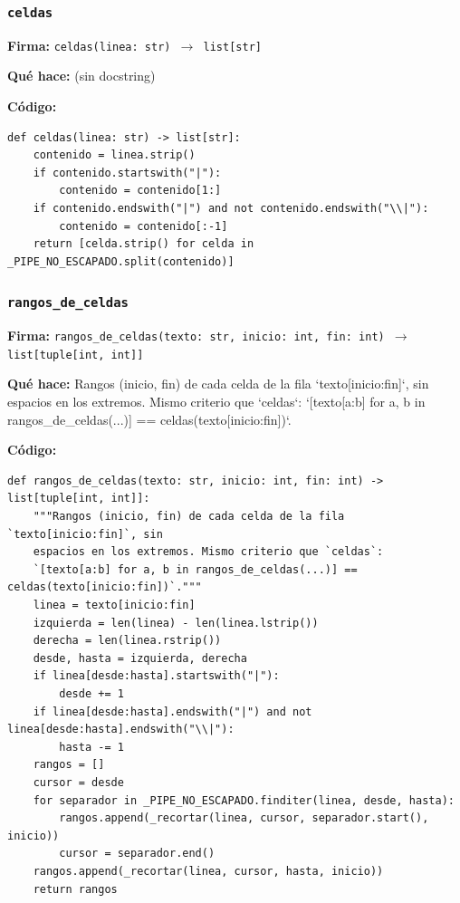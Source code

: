 \documentclass[11pt,a4paper]{article}
\begin{document}
\subsubsection*{\texttt{celdas}}
\textbf{Firma:} \texttt{celdas(linea: str) $\rightarrow$ list[str]}

\textbf{Qué hace:} (sin docstring)

\textbf{Código:}
\begin{lstlisting}
def celdas(linea: str) -> list[str]:
    contenido = linea.strip()
    if contenido.startswith("|"):
        contenido = contenido[1:]
    if contenido.endswith("|") and not contenido.endswith("\\|"):
        contenido = contenido[:-1]
    return [celda.strip() for celda in _PIPE_NO_ESCAPADO.split(contenido)]
\end{lstlisting}

\subsubsection*{\texttt{rangos\_de\_celdas}}
\textbf{Firma:} \texttt{rangos\_de\_celdas(texto: str, inicio: int, fin: int) $\rightarrow$ list[tuple[int, int]]}

\textbf{Qué hace:} Rangos (inicio, fin) de cada celda de la fila `texto[inicio:fin]`, sin
espacios en los extremos. Mismo criterio que `celdas`:
`[texto[a:b] for a, b in rangos\_de\_celdas(...)] == celdas(texto[inicio:fin])`.

\textbf{Código:}
\begin{lstlisting}
def rangos_de_celdas(texto: str, inicio: int, fin: int) -> list[tuple[int, int]]:
    """Rangos (inicio, fin) de cada celda de la fila `texto[inicio:fin]`, sin
    espacios en los extremos. Mismo criterio que `celdas`:
    `[texto[a:b] for a, b in rangos_de_celdas(...)] == celdas(texto[inicio:fin])`."""
    linea = texto[inicio:fin]
    izquierda = len(linea) - len(linea.lstrip())
    derecha = len(linea.rstrip())
    desde, hasta = izquierda, derecha
    if linea[desde:hasta].startswith("|"):
        desde += 1
    if linea[desde:hasta].endswith("|") and not linea[desde:hasta].endswith("\\|"):
        hasta -= 1
    rangos = []
    cursor = desde
    for separador in _PIPE_NO_ESCAPADO.finditer(linea, desde, hasta):
        rangos.append(_recortar(linea, cursor, separador.start(), inicio))
        cursor = separador.end()
    rangos.append(_recortar(linea, cursor, hasta, inicio))
    return rangos
\end{lstlisting}
\end{document}
